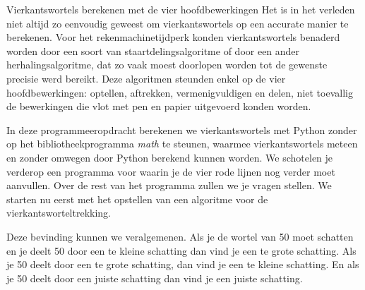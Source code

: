     \begin{lesactiviteit}{Vierkantswortels berekenen met de vier hoofdbewerkingen}
    Het is in het verleden niet altijd zo eenvoudig geweest om vierkantswortels op een accurate manier te berekenen. Voor het rekenmachinetijdperk konden vierkantswortels benaderd worden door een soort van staartdelingsalgoritme of door een ander herhalingsalgoritme, dat zo vaak moest doorlopen worden tot de gewenste precisie werd bereikt. Deze algoritmen steunden enkel op de vier hoofdbewerkingen: optellen, aftrekken, vermenigvuldigen en delen, niet toevallig de bewerkingen die vlot met pen en papier uitgevoerd konden worden. 
    
    In deze programmeeropdracht berekenen we vierkantswortels met Python zonder op het bibliotheekprogramma \emph{math} te steunen, waarmee vierkantswortels meteen en zonder omwegen door Python berekend kunnen worden. We schotelen je verderop een programma voor waarin je de vier rode lijnen nog verder moet aanvullen. Over de rest van het programma zullen we je vragen stellen. We starten nu eerst met het opstellen van een algoritme voor de vierkantsworteltrekking.
    
    \begin{vraagenantwoord}
     \end{vraagenantwoord}
     
     Deze bevinding kunnen we veralgemenen. Als je de wortel van 50 moet schatten en je deelt 50 door een te kleine schatting dan vind je een te grote schatting. Als je 50 deelt door een te grote schatting, dan vind je een te kleine schatting. En als je 50 deelt door een juiste schatting dan vind je een juiste schatting.
     

\end{lesactiviteit}

